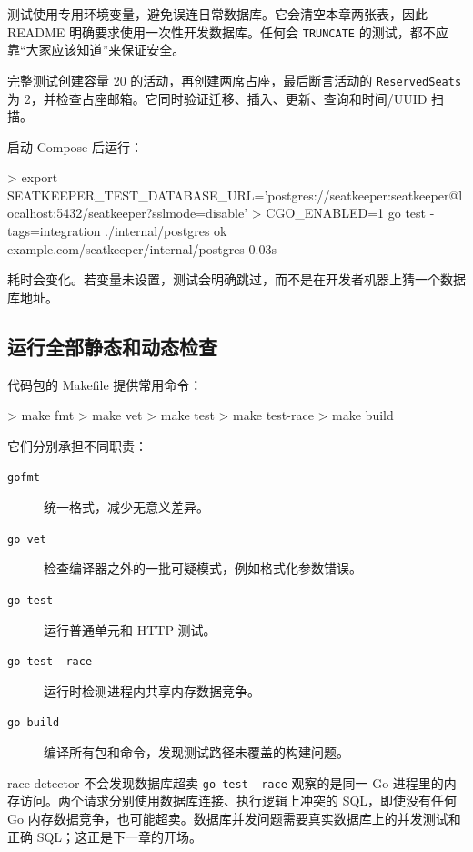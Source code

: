 测试使用专用环境变量，避免误连日常数据库。它会清空本章两张表，因此 README 明确要求使用一次性开发数据库。任何会 \texttt{TRUNCATE} 的测试，都不应靠“大家应该知道”来保证安全。

完整测试创建容量 20 的活动，再创建两席占座，最后断言活动的 \texttt{ReservedSeats} 为 2，并检查占座邮箱。它同时验证迁移、插入、更新、查询和时间/UUID 扫描。

启动 Compose 后运行：

\begin{shellcode}[title={运行 PostgreSQL 集成测试}]
> export SEATKEEPER_TEST_DATABASE_URL='postgres://seatkeeper:seatkeeper@localhost:5432/seatkeeper?sslmode=disable'
> CGO_ENABLED=1 go test -tags=integration ./internal/postgres
ok      example.com/seatkeeper/internal/postgres  0.03s
\end{shellcode}
\color{PocketInk}

耗时会变化。若变量未设置，测试会明确跳过，而不是在开发者机器上猜一个数据库地址。

\subsection{运行全部静态和动态检查}

代码包的 Makefile 提供常用命令：

\begin{shellcode}[title={本章 checkpoint 检查}]
> make fmt
> make vet
> make test
> make test-race
> make build
\end{shellcode}
\color{PocketInk}

它们分别承担不同职责：

\begin{description}
  \item[\texttt{gofmt}] 统一格式，减少无意义差异。
  \item[\texttt{go vet}] 检查编译器之外的一批可疑模式，例如格式化参数错误。
  \item[\texttt{go test}] 运行普通单元和 HTTP 测试。
  \item[\texttt{go test -race}] 运行时检测进程内共享内存数据竞争。
  \item[\texttt{go build}] 编译所有包和命令，发现测试路径未覆盖的构建问题。
\end{description}

\begin{warningbox}{race detector 不会发现数据库超卖}
\texttt{go test -race} 观察的是同一 Go 进程里的内存访问。两个请求分别使用数据库连接、执行逻辑上冲突的 SQL，即使没有任何 Go 内存数据竞争，也可能超卖。数据库并发问题需要真实数据库上的并发测试和正确 SQL；这正是下一章的开场。
\end{warningbox}

